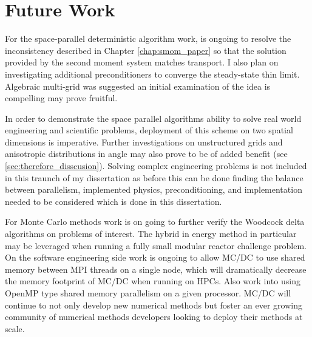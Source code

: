 \section{Future Work}

For the space-parallel deterministic algorithm work, is ongoing to resolve the inconsistency described in Chapter \ref{chap:smom_paper} so that the solution provided by the second moment system matches transport.
I also plan on investigating additional preconditioners to converge the steady-state thin limit.
Algebraic multi-grid was suggested an initial examination of the idea is compelling may prove fruitful.

In order to demonstrate the space parallel algorithms ability to solve real world engineering and scientific problems, deployment of this scheme on two spatial dimensions is imperative.
Further investigations on unstructured grids and anisotropic distributions in angle may also prove to be of added benefit (see \ref{sec:therefore_disscusion}).
Solving complex engineering problems is not included in this traunch of my dissertation as before this can be done finding the balance between parallelism, implemented physics, preconditioning, and implementation needed to be considered which is done in this dissertation.

For Monte Carlo methods work is on going to further verify the Woodcock delta algorithms on problems of interest.
The hybrid in energy method in particular may be leveraged when running a fully small modular reactor challenge problem.
On the software engineering side work is ongoing to allow MC/DC to use shared memory between MPI threads on a single node, which will dramatically decrease the memory footprint of MC/DC when running on HPCs.
Also work into using OpenMP type shared memory parallelism on a given processor.
MC/DC will continue to not only develop new numerical methods but foster an ever growing community of numerical methods developers looking to deploy their methods at scale.